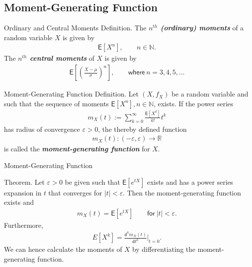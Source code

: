 \documentclass[hyperref={pdfpagelabels=false}]{beamer}
\newcommand{\R}{\mathbb{R}}
\newcommand{\N}{\mathbb{N}}
\newcommand{\U}{\mathsf}
\newcommand{\highlightg}[1]{\textcolor[rgb]{0.1,0.5,0.3}{\emph{\textbf{#1}}}}
\newcommand{\structb}[1]{\textcolor[rgb]{0.2,0.2,0.7}{#1}}
\begin{document}
\subsection{Moment-Generating Function}
%
\begin{frame}{Ordinary and Central Moments}
    \justifying
    \structb{Definition.} The \highlightg{$n^{th}$ (ordinary) moments} of a random variable $X$ is given by
    \begin{align*}
        \U{E}[X^n], \qquad n\in \N.
    \end{align*}
    The \highlightg{$n^{th}$ central moments} of $X$ is given by
    \begin{align*}
        \U{E}\left[\left(\frac{X-\mu}{\sigma} \right)^n \right], \qquad \U{where\ } n = 3, 4, 5, \ldots
    \end{align*}
\end{frame}
%
\begin{frame}{Moment-Generating Function}
    \justifying
    \structb{Definition.} Let $(X, f_X)$ be a random variable and such that the sequence of moments $\U{E}[X^n], n\in \N$, exists. If the power series 
    \begin{align*}
        m_X(t) := \sum_{k=0}^{\infty} \frac{\U{E}[X^k]}{k!} t^k
    \end{align*}
    has radius of convergence $\varepsilon > 0$, the thereby defined function
    \begin{align*}
        m_X(t): (-\varepsilon, \varepsilon) \rightarrow \R
    \end{align*}
    is called the \highlightg{moment-generating function} for $X$.
\end{frame}


\begin{frame}{Moment-Generating Function}

\justifying
\structb{Theorem.} Let $\varepsilon > 0$ be given such that $\U{E}[e^{tX}]$ exists and has a power series expansion in $t$ that converges for $|t| < \varepsilon$. Then the moment-generating function exists and 
\begin{align*}
m_X(t) = \U{E}[e^{tX}] \qquad \U{for\ } |t| < \varepsilon.
\end{align*}
Furthermore, 
\begin{align*}
E[X^k] = \frac{\U{d}^k m_X(t)}{\U{d}t^k}\bigg|_{t=0}.
\end{align*}
We can hence calculate the moments of $X$ by differentiating the moment-generating function.

\end{frame}
\end{document}
